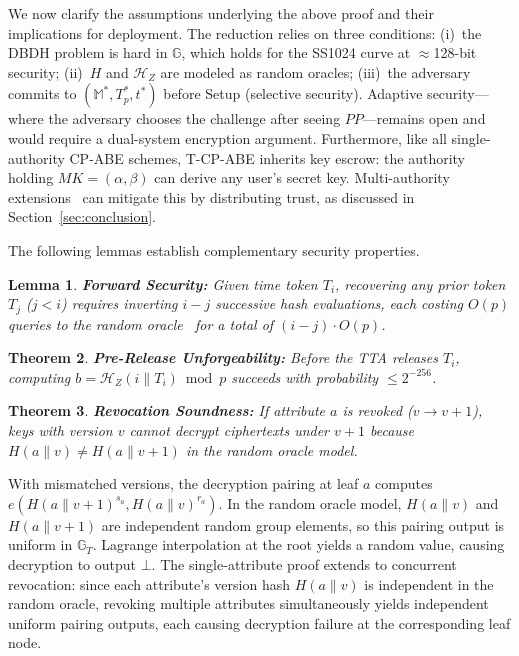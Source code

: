 ﻿\documentclass[lettersize,journal]{IEEEtran}
\makeatletter
\renewcommand{\proofname}{\bfseries Proof}
\renewenvironment{proof}[1][\proofname]{\par
  \pushQED{\qed}%
  \normalfont \topsep6\p@\@plus6\p@\relax
  \trivlist
  \item[\hskip\labelsep
        \itshape
  #1\@addpunct{:}]\ignorespaces
}{%
  \popQED\endtrivlist\@endpefalse
}
\newtheorem{theorem}{Theorem}
\newtheorem{lemma}[theorem]{Lemma}
\makeatother
\begin{document}
We now clarify the assumptions underlying the above proof and
their implications for deployment. The reduction relies on
three conditions: (i)~the DBDH problem is hard in
$\mathbb{G}$, which holds for the SS1024 curve at $\approx$128-bit
security; (ii)~$H$ and $\mathcal{H}_Z$ are modeled as random oracles;
(iii)~the adversary commits to $(\mathbb{M}^*, T_p^*, t^*)$ before
Setup (selective security). Adaptive security---where the adversary
chooses the challenge after seeing $PP$---remains open and would require
a dual-system encryption argument. Furthermore, like all single-authority CP-ABE
schemes, T-CP-ABE inherits key escrow: the authority holding
$MK = (\alpha, \beta)$ can derive any user's secret key. Multi-authority
extensions~\cite{DecentralisedMAABE2025} can mitigate this by
distributing trust, as discussed in Section~\ref{sec:conclusion}.

The following lemmas establish complementary security properties.

\begin{lemma}
\label{lem:forward_security}
\textbf{Forward Security:}
Given time token $T_i$, recovering any prior token $T_j$ ($j < i$)
requires inverting $i{-}j$ successive hash evaluations, each costing
$O(p)$ queries to the random oracle~\cite{Boneh1998_CDH} for a total of
$(i{-}j)\cdot O(p)$.
\end{lemma}

\begin{theorem}
\label{thm:prerelease}
\textbf{Pre-Release Unforgeability:}
Before the TTA releases $T_i$, computing
$b = \mathcal{H}_Z(i \| T_i) \bmod p$ succeeds with probability
$\leq 2^{-256}$.
\end{theorem}

\begin{theorem}
\label{thm:revocation}
\textbf{Revocation Soundness:}
If attribute $a$ is revoked ($v \to v{+}1$), keys with
version $v$ cannot decrypt ciphertexts under $v{+}1$ because
$H(a \| v) \neq H(a \| v{+}1)$ in the random oracle model.
\end{theorem}

\begin{proof}
With mismatched versions, the decryption pairing at leaf $a$ computes
$e(H(a\|v{+}1)^{s_a}, H(a\|v)^{r_a})$. In the random oracle model,
$H(a\|v)$ and $H(a\|v{+}1)$ are independent random group elements, so
this pairing output is uniform in $\mathbb{G}_T$. Lagrange interpolation
at the root yields a random value, causing decryption to output $\bot$.
The single-attribute proof extends to concurrent revocation: since each
attribute's version hash $H(a\|v)$ is independent in the random oracle,
revoking multiple attributes simultaneously yields independent uniform
pairing outputs, each causing decryption failure at the corresponding
leaf node.
\end{proof}
\end{document}
